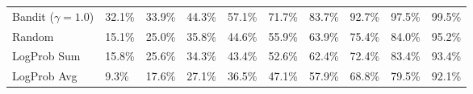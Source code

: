 \begin{tabular}{lYYYYYYYYY}
Bandit ($\gamma=1.0$) & 
32.1\% & 33.9\% & 44.3\% & 57.1\% & 71.7\% & 83.7\% & 92.7\% & 97.5\% & 99.5\%\\
Random & 
15.1\% & 25.0\% & 35.8\% & 44.6\% & 55.9\% & 63.9\% & 75.4\% & 84.0\% & 95.2\%\\
LogProb Sum & 
15.8\% & 25.6\% & 34.3\% & 43.4\% & 52.6\% & 62.4\% & 72.4\% & 83.4\% & 93.4\%\\
LogProb Avg & 
9.3\% & 17.6\% & 27.1\% & 36.5\% & 47.1\% & 57.9\% & 68.8\% & 79.5\% & 92.1\%\\
\bottomrule\end{tabular}
